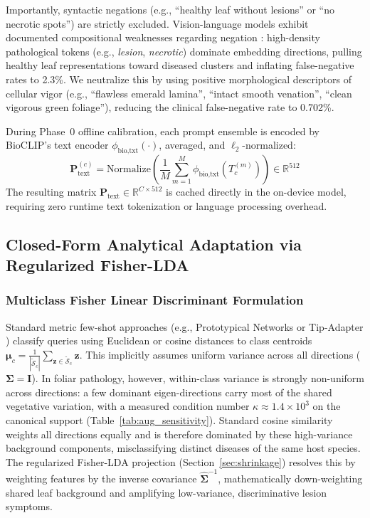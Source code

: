 \documentclass[preprint,12pt]{elsarticle}
\begin{document}
Importantly, syntactic negations (e.g., ``healthy leaf without lesions'' or ``no necrotic spots'') are strictly excluded. Vision-language models exhibit documented compositional weaknesses regarding negation \cite{radford2021clip, yuksekgonul2023when, alhamoud2025vision}: high-density pathological tokens (e.g., \textit{lesion}, \textit{necrotic}) dominate embedding directions, pulling healthy leaf representations toward diseased clusters and inflating false-negative rates to 2.3\%. We neutralize this by using positive morphological descriptors of cellular vigor (e.g., ``flawless emerald lamina'', ``intact smooth venation'', ``clean vigorous green foliage''), reducing the clinical false-negative rate to 0.702\%.

During Phase~0 offline calibration, each prompt ensemble is encoded by BioCLIP's text encoder $\phi_{\text{bio,txt}}(\cdot)$, averaged, and $\ell_2$-normalized:
\begin{equation}
    \mathbf{P}_{\text{text}}^{(c)} = \text{Normalize}\left(\frac{1}{M}\sum_{m=1}^M \phi_{\text{bio,txt}}(T_c^{(m)})\right) \in \mathbb{R}^{512}
\end{equation}
The resulting matrix $\mathbf{P}_{\text{text}} \in \mathbb{R}^{C \times 512}$ is cached directly in the on-device model, requiring zero runtime text tokenization or language processing overhead.

\subsection{Closed-Form Analytical Adaptation via Regularized Fisher-LDA}
\label{sec:fisher_adaptation}

\subsubsection{Multiclass Fisher Linear Discriminant Formulation}
Standard metric few-shot approaches (e.g., Prototypical Networks \cite{snell2017prototypical} or Tip-Adapter \cite{zhang2022tip}) classify queries using Euclidean or cosine distances to class centroids $\boldsymbol{\mu}_c = \frac{1}{|\tilde{\mathcal{S}}_c|}\sum_{\mathbf{z} \in \tilde{\mathcal{S}}_c}\mathbf{z}$. This implicitly assumes uniform variance across all directions ($\mathbf{\Sigma} = \mathbf{I}$). In foliar pathology, however, within-class variance is strongly non-uniform across directions: a few dominant eigen-directions carry most of the shared vegetative variation, with a measured condition number $\kappa \approx 1.4\times10^{3}$ on the canonical support (Table~\ref{tab:aug_sensitivity}). Standard cosine similarity weights all directions equally and is therefore dominated by these high-variance background components, misclassifying distinct diseases of the same host species. The regularized Fisher-LDA projection (Section~\ref{sec:shrinkage}) resolves this by weighting features by the inverse covariance $\hat{\mathbf{\Sigma}}^{-1}$, mathematically down-weighting shared leaf background and amplifying low-variance, discriminative lesion symptoms.
\end{document}
